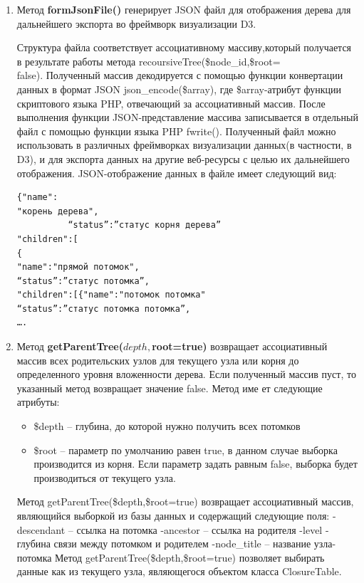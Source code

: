 \documentclass[a4paper,14pt]{extreport}
\theoremstyle{definition}
\begin{document}
\begin{enumerate}
\item Метод \textbf{ formJsonFile()} генерирует JSON файл для отображения дерева для дальнейшего экспорта во фреймворк визуализации D3.

Структура файла соответствует ассоциативному массиву,который получается в результате работы метода recoursiveTree(\$node\_id,\$root= \\ false). Полученный массив декодируется с помощью функции конвертации данных в формат JSON json\_encode(\$array), где \$array-атрибут функции скриптового языка PHP, отвечающий за ассоциативный массив. После выполнения функции JSON-представление массива записывается в отдельный файл с помощью функции языка PHP fwrite(). Полученный файл можно использовать в различных фреймворках визуализации данных(в частности, в D3), и для экспорта данных на другие веб-ресурсы с целью их дальнейшего отображения. JSON-отображение данных в файле имеет следующий вид:
\begin{verbatim}{"name":
"корень дерева",
          “status”:”статус корня дерева”
"children":[
{
"name":"прямой потомок",
“status”:”статус потомка”,
"children":[{"name":"потомок потомка"
“status”:”статус потомка потомка”,
….\end{verbatim}

\item Метод \textbf{getParentTree($depth,$root=true)} возвращает ассоциативный массив всех родительских узлов для текущего узла или корня до определенного уровня вложенности дерева. Если полученный массив пуст, то указанный метод возвращает значение false.
Метод име
ет следующие атрибуты:
\begin{itemize}
\item \$depth – глубина, до которой нужно получить всех потомков
\item \$root – параметр по умолчанию равен true, в данном случае выборка производится из корня. Если параметр задать равным false, выборка будет производиться от текущего узла.
\end{itemize}
Метод getParentTree(\$depth,\$root=true) возвращает ассоциативный массив, являющийся выборкой из базы данных и содержащий следующие поля:
-descendant – ссылка на потомка
-ancestor – ссылка на родителя
-level - глубина связи между потомком и родителем
-node\_title – название узла-потомка
Метод getParentTree(\$depth,\$root=true) позволяет выбирать данные как из текущего узла, являющегося объектом класса ClosureTable.


\end{enumerate}
\end{document}
